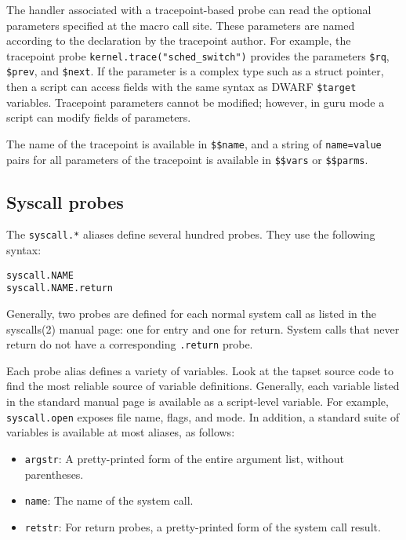 \documentclass[twoside,english]{article}
\newenvironment{vindent}
{\begin{list}{}{\setlength{\listparindent}{6pt}}
\item[]}
{\end{list}}
\begin{document}
The handler associated with a tracepoint-based probe can read the
optional parameters specified at the macro call site.  These
parameters are named according to the declaration by the tracepoint
author.  For example, the tracepoint probe
\texttt{kernel.trace("sched\_switch")} provides the parameters
\texttt{\$rq}, \texttt{\$prev}, and \texttt{\$next}.  If the parameter
is a complex type such as a struct pointer, then a script can access
fields with the same syntax as DWARF \texttt{\$target} variables.
Tracepoint parameters cannot be modified; however, in guru mode a
script can modify fields of parameters.

The name of the tracepoint is available in \texttt{\$\$name}, and a
string of \texttt{name=value} pairs for all parameters of the
tracepoint is available in \texttt{\$\$vars} or \texttt{\$\$parms}.


\subsection{Syscall probes}
\label{sec:syscall}
The \texttt{syscall.*}  aliases define several hundred probes.  They
use the following syntax:
\begin{vindent}
\begin{verbatim}
syscall.NAME
syscall.NAME.return
\end{verbatim}
\end{vindent}

Generally, two probes are defined for each normal system call as
listed in the syscalls(2) manual page: one for entry and one for
return.   System calls that never return do not have a
corresponding \texttt{.return} probe.

Each probe alias defines a variety of variables. Look at the tapset
source code to find the most reliable source of variable definitions.
Generally, each variable listed in the standard manual page is
available as a script-level variable. For example,
\texttt{syscall.open} exposes file name, flags, and mode.  In addition,
a standard suite of variables is available at most aliases, as follows:

\begin{itemize}
\item \texttt{argstr}: A pretty-printed form of the entire argument
  list, without parentheses.
\item \texttt{name}: The name of the system call.
\item \texttt{retstr}: For return probes, a pretty-printed form of the
  system call result.
\end{itemize}
\end{document}
